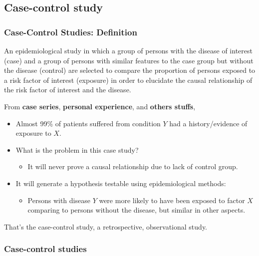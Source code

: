 \documentclass[table,10pt]{beamer}
\begin{document}
\begin{CJK*}{UTF8}{gbsn}
\section{Case-control study}


\begin{frame}[t]
\frametitle{Case-Control Studies: Definition}
An epidemiological study in which a group of persons with the disease 
of interest (\alert{case}) and a group of persons with similar features 
to the case group but without the disease (\alert{control}) are selected 
to compare the proportion of persons exposed to a risk factor of interest 
(\alert{exposure}) in order to elucidate the causal relationship of the 
risk factor of interest and the disease.

From \textbf{case series}, \textbf{personal experience}, and \textbf{others stuffs},
\begin{itemize}
	\item Almost 99\% of patients suffered from condition $Y$ had a 
		history/evidence of exposure to $X$.
	\item What is the problem in this case study?
	\begin{itemize}
		\item It will never prove a causal relationship due to lack of 
			control group.
	\end{itemize}
	\item It will generate a hypothesis testable using epidemiological methods:
	\begin{itemize}
		\item Persons with disease $Y$ were more likely to have been exposed 
			to factor $X$ comparing to persons without the disease, but 
			similar in other aspects.
	\end{itemize} 
\end{itemize}
That's the case-control study, a retrospective, observational study.
\end{frame}

\begin{frame}[t]
\frametitle{Case-control studies}


\end{frame}
\end{CJK*}
\end{document}
